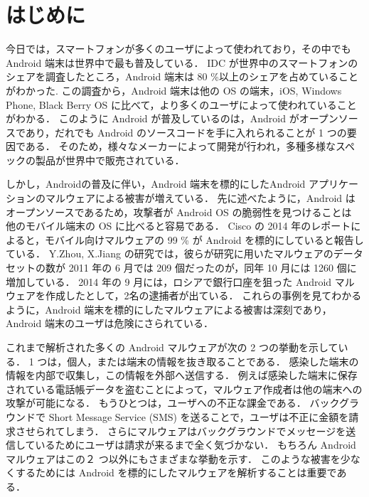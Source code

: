 \section{はじめに}
\label{sec:intro}
今日では，スマートフォンが多くのユーザによって使われており，その中でも Android 端末は世界中で最も普及している．
IDC が世界中のスマートフォンのシェアを調査したところ，Android 端末は 80 \%以上のシェアを占めていることがわかった\cite{osshare}.
この調査から，Android 端末は他の OS の端末，iOS, Windows Phone, Black Berry OS に比べて，より多くのユーザによって使われていることがわかる．
このように Android が普及しているのは，Android がオープンソースであり，だれでも Android のソースコードを手に入れられることが 1 つの要因である．
そのため，様々なメーカーによって開発が行われ，多種多様なスペックの製品が世界中で販売されている．

しかし，Androidの普及に伴い，Android 端末を標的にしたAndroid アプリケーションのマルウェアによる被害が増えている．
先に述べたように，Android はオープンソースであるため，攻撃者が Android OS の脆弱性を見つけることは 他のモバイル端末の OS に比べると容易である．
Cisco の 2014 年のレポート\cite{cisco}によると，モバイル向けマルウェアの 99 \% が Android を標的にしていると報告している．
Y.Zhou, X.Jiang の研究\cite{dissect}では，彼らが研究に用いたマルウェアのデータセットの数が 2011 年の 6 月では 209 個だったのが，同年 10 月には 1260 個に増加している．
2014 年の 9 月には，ロシアで銀行口座を狙った Android マルウェアを作成したとして，2名の逮捕者が出ている．
これらの事例を見てわかるように，Android 端末を標的にしたマルウェアによる被害は深刻であり，Android 端末のユーザは危険にさられている．

これまで解析された多くの Android マルウェアが次の 2 つの挙動を示している．
1 つは，個人，または端末の情報を抜き取ることである．
感染した端末の情報を内部で収集し，この情報を外部へ送信する．
例えば感染した端末に保存されている電話帳データを盗むことによって，マルウェア作成者は他の端末への攻撃が可能になる．
もうひとつは，ユーザへの不正な課金である．
バックグラウンドで Short Message Service (SMS) を送ることで，ユーザは不正に金額を請求させられてしまう．
さらにマルウェアはバックグラウンドでメッセージを送信しているためにユーザは請求が来るまで全く気づかない．
もちろん Android マルウェアはこの２ つ以外にもさまざまな挙動を示す．
このような被害を少なくするためには Android を標的にしたマルウェアを解析することは重要である．

